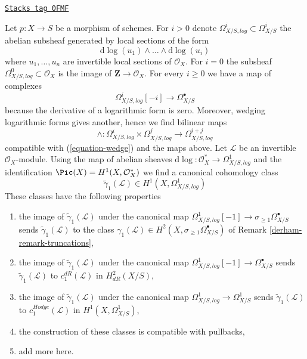 \begin{remark}
\label{derham-remark-log-forms}
\href{https://stacks.math.columbia.edu/tag/0FMF}{\texttt{Stacks tag 0FMF}}

Let $p : X \to S$ be a morphism of schemes. For $i > 0$
denote $\Omega^i_{X/S, log} \subset \Omega^i_{X/S}$ the abelian subsheaf
generated by local sections of the form
$$
\text{d}\log(u_1) \wedge \ldots \wedge \text{d}\log(u_i)
$$
where $u_1, \ldots, u_n$ are invertible local sections of $\mathcal{O}_X$.
For $i = 0$ the subsheaf $\Omega^0_{X/S, log} \subset \mathcal{O}_X$
is the image of $\mathbf{Z} \to \mathcal{O}_X$. For every $i \geq 0$ we
have a map of complexes
$$
\Omega^i_{X/S, log}[-i] \longrightarrow \Omega^\bullet_{X/S}
$$
because the derivative of a logarithmic form is zero. Moreover, wedging
logarithmic forms gives another, hence we find bilinear maps
$$
\wedge :  \Omega^i_{X/S, log} \times
\Omega^j_{X/S, log} \longrightarrow \Omega^{i + j}_{X/S, log}
$$
compatible with (\ref{equation-wedge}) and the maps above.
Let $\mathcal{L}$ be an invertible $\mathcal{O}_X$-module.
Using the map of abelian sheaves
$\text{d}\log : \mathcal{O}_X^* \to \Omega^1_{X/S, log}$
and the identification $\Pic(X) = H^1(X, \mathcal{O}_X^*)$
we find a canonical cohomology class
$$
\tilde \gamma_1(\mathcal{L}) \in H^1(X, \Omega^1_{X/S, log})
$$
These classes have the following properties
\begin{enumerate}
\item the image of $\tilde \gamma_1(\mathcal{L})$ under the canonical
map $\Omega^1_{X/S, log}[-1] \to \sigma_{\geq 1}\Omega^\bullet_{X/S}$
sends $\tilde \gamma_1(\mathcal{L})$ to the class
$\gamma_1(\mathcal{L}) \in
H^2(X, \sigma_{\geq 1}\Omega^\bullet_{X/S})$
of Remark \ref{derham-remark-truncations},
\item the image of $\tilde \gamma_1(\mathcal{L})$ under the canonical
map $\Omega^1_{X/S, log}[-1] \to \Omega^\bullet_{X/S}$
sends $\tilde \gamma_1(\mathcal{L})$ to $c_1^{dR}(\mathcal{L})$ in
$H^2_{dR}(X/S)$,
\item the image of $\tilde \gamma_1(\mathcal{L})$ under the canonical
map $\Omega^1_{X/S, log} \to \Omega^1_{X/S}$
sends $\tilde \gamma_1(\mathcal{L})$ to $c_1^{Hodge}(\mathcal{L})$ in
$H^1(X, \Omega^1_{X/S})$,
\item the construction of these classes is compatible with pullbacks,
\item add more here.
\end{enumerate}
\end{remark}

